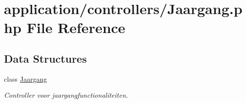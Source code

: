 \hypertarget{_jaargang_8php}{}\section{application/controllers/\+Jaargang.php File Reference}
\label{_jaargang_8php}
\subsection*{Data Structures}
\begin{DoxyCompactItemize}
\item 
class \mbox{\hyperlink{class_jaargang}{Jaargang}}
\begin{DoxyCompactList}\small\item\em Controller voor jaargangfunctionaliteiten. \end{DoxyCompactList}\end{DoxyCompactItemize}
